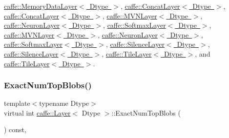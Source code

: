 \mbox{\hyperlink{classcaffe_1_1_memory_data_layer_af714b4cbc022be1592ad26c300b63ae4}{caffe\+::\+Memory\+Data\+Layer$<$ Dtype $>$}}, \mbox{\hyperlink{classcaffe_1_1_concat_layer_a0f19a4cac8676927f9c83010957a2921}{caffe\+::\+Concat\+Layer$<$ Dtype $>$}}, \mbox{\hyperlink{classcaffe_1_1_concat_layer_a0f19a4cac8676927f9c83010957a2921}{caffe\+::\+Concat\+Layer$<$ Dtype $>$}}, \mbox{\hyperlink{classcaffe_1_1_m_v_n_layer_ae10d9ef135adf3cd25e86ce06188c814}{caffe\+::\+M\+V\+N\+Layer$<$ Dtype $>$}}, \mbox{\hyperlink{classcaffe_1_1_neuron_layer_a47ac5e7208e4b14ad1e4040a621dbfbc}{caffe\+::\+Neuron\+Layer$<$ Dtype $>$}}, \mbox{\hyperlink{classcaffe_1_1_softmax_layer_a6bc4748c20e0940e5367ed4d50f4a11b}{caffe\+::\+Softmax\+Layer$<$ Dtype $>$}}, \mbox{\hyperlink{classcaffe_1_1_m_v_n_layer_ae10d9ef135adf3cd25e86ce06188c814}{caffe\+::\+M\+V\+N\+Layer$<$ Dtype $>$}}, \mbox{\hyperlink{classcaffe_1_1_neuron_layer_a47ac5e7208e4b14ad1e4040a621dbfbc}{caffe\+::\+Neuron\+Layer$<$ Dtype $>$}}, \mbox{\hyperlink{classcaffe_1_1_softmax_layer_a6bc4748c20e0940e5367ed4d50f4a11b}{caffe\+::\+Softmax\+Layer$<$ Dtype $>$}}, \mbox{\hyperlink{classcaffe_1_1_silence_layer_a1e072cbda98dbc57001ce92432b045b8}{caffe\+::\+Silence\+Layer$<$ Dtype $>$}}, \mbox{\hyperlink{classcaffe_1_1_silence_layer_a1e072cbda98dbc57001ce92432b045b8}{caffe\+::\+Silence\+Layer$<$ Dtype $>$}}, \mbox{\hyperlink{classcaffe_1_1_tile_layer_a1040cc3b4fb028d54f67a685513d745b}{caffe\+::\+Tile\+Layer$<$ Dtype $>$}}, and \mbox{\hyperlink{classcaffe_1_1_tile_layer_a1040cc3b4fb028d54f67a685513d745b}{caffe\+::\+Tile\+Layer$<$ Dtype $>$}}.

\mbox{\label{classcaffe_1_1_layer_a64e2ca72c719e4b2f1f9216ccfb0d37f}} 
\subsubsection{\texorpdfstring{Exact\+Num\+Top\+Blobs()}{ExactNumTopBlobs()}\hspace{0.1cm}{\footnotesize\ttfamily [2/2]}}
{\footnotesize\ttfamily template$<$typename Dtype$>$ \\
virtual int \mbox{\hyperlink{classcaffe_1_1_layer}{caffe\+::\+Layer}}$<$ Dtype $>$\+::Exact\+Num\+Top\+Blobs (\begin{DoxyParamCaption}{ }\end{DoxyParamCaption}) const\hspace{0.3cm}{\ttfamily [inline]}, {\ttfamily [virtual]}}



